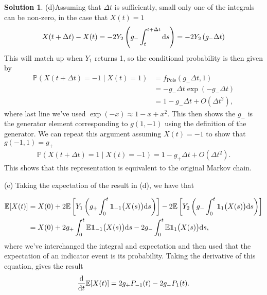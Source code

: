 \documentclass[12pt]{article}
\newcommand{\Prob}{\mathbb{P}}
\newcommand{\Expect}{\mathbb{E}}
\def\rd{{\rm d}}
\theoremstyle{definition}
\newtheorem{sol}{Solution}
\theoremstyle{remark}
\def\d{{\rm d}}
\begin{document}
\begin{sol}
    (d)Assuming that $\Delta t$ is sufficiently, small only one of the integrals can be non-zero, in the case that $X(t) = 1$
    \begin{align*} 
        X(t + \Delta t) - X(t) = - 2 Y_{2} \left( g_{-} \int_{t}^{t + \Delta t} \d s\right) = -2 Y_{2} \left( g_{-}
\Delta t\right)\\
    \end{align*}
    This will match up when $Y_{1}$ returns 1, so the conditional probability is then given by
    \begin{align*}
        \Prob( X(t+\Delta t) = -1  \mid X(t) = 1) &= f_{\text{Pois}}(g_{-} \Delta t, 1)\\
                                                 &= -g_{-}  \Delta t\exp( - g_{-} \Delta t) \\
                                                 &=  1 - g_{-}\Delta t + O(\Delta t^{2}), 
    \end{align*}
    where last line we've used $\exp(-x) \approx 1 - x + x^{2}$. This then shows the $g_{-}$ is the generator element corresponding to $g(1, -1)$ using the definition of the generator. We can repeat this argument assuming  $X(t) = -1$ to show that $g(-1, 1) = g_{+}$
\begin{align*}
    \Prob( X(t+\Delta t) = 1 \mid X(t) = -1 ) = 1 - g_{+} \Delta t + O(\Delta t^{2}).
\end{align*}
This shows that this representation is equivalent to the original Markov chain.

    (e) Taking the expectation of the result in (d), we have that

    \begin{align*}
        \Expect[X(t)] &= X(0) 
        + 2 \Expect\left[ Y_1\left( g_+\int_0^t \mathbf{1}_{-1}\big(
     X(s)\big) \rd s \right) \right]  
     - 2 \Expect\left[ Y_2\left(g_-\int_0^t \mathbf{1}_{1}\big(
     X(s)\big) \rd s \right)  \right] \\
                      &= X(0) + 2g_{+} \int_{0}^{t} \Expect \mathbf{1}_{-1}\big(
     X(s)\big)  \d s - 2g_{-} \int_{0}^{t} \Expect \mathbf{1}_{1}\big(
     X(s)\big)  \d s,
    \end{align*}
    where we've interchanged the integral and expectation and then used that the expectation of an indicator event is its probability. Taking the derivative of this equation, gives the result
    \begin{align*}
    \frac{\d }{\d t} \Expect[X(t)] = 2g_{+} P_{-1}(t) - 2g_{-} P_{1}(t).
    \end{align*}
\end{sol}
\end{document}
